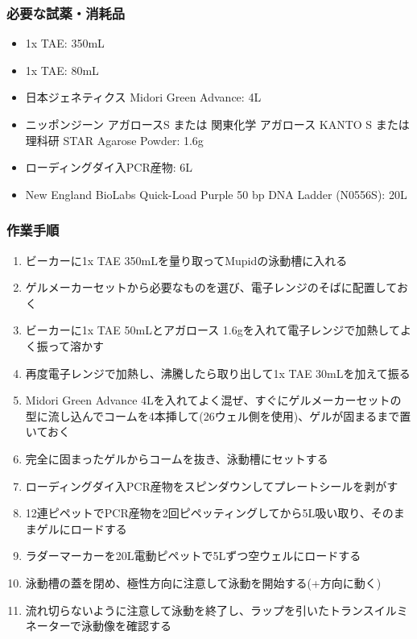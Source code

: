 \documentclass[titlepage,10pt,a4paper,uplatex]{jsbook}
\begin{document}
\subsubsection{必要な試薬・消耗品}
\begin{itemize}
\item 1x TAE: 350mL
\item 1x TAE: 80mL
\item 日本ジェネティクス Midori Green Advance: 4{\textmu}L
\item ニッポンジーン アガロースS または 関東化学 アガロース KANTO S または 理科研 STAR Agarose Powder: 1.6g
\item ローディングダイ入PCR産物: 6{\textmu}L
\item New England BioLabs Quick-Load Purple 50 bp DNA Ladder (N0556S): 20{\textmu}L
\end{itemize}

\subsubsection{作業手順}
\begin{enumerate}
\item ビーカーに1x TAE 350mLを量り取ってMupidの泳動槽に入れる
\item ゲルメーカーセットから必要なものを選び、電子レンジのそばに配置しておく
\item ビーカーに1x TAE 50mLとアガロース 1.6gを入れて電子レンジで加熱してよく振って溶かす
\item 再度電子レンジで加熱し、沸騰したら取り出して1x TAE 30mLを加えて振る
\item Midori Green Advance 4{\textmu}Lを入れてよく混ぜ、すぐにゲルメーカーセットの型に流し込んでコームを4本挿して(26ウェル側を使用)、ゲルが固まるまで置いておく
\item 完全に固まったゲルからコームを抜き、泳動槽にセットする
\item ローディングダイ入PCR産物をスピンダウンしてプレートシールを剥がす
\item 12連ピペットでPCR産物を2回ピペッティングしてから5{\textmu}L吸い取り、そのままゲルにロードする
\item ラダーマーカーを20{\textmu}L電動ピペットで5{\textmu}Lずつ空ウェルにロードする
\item 泳動槽の蓋を閉め、極性方向に注意して泳動を開始する(+方向に動く)
\item 流れ切らないように注意して泳動を終了し、ラップを引いたトランスイルミネーターで泳動像を確認する
\end{enumerate}
\end{document}
